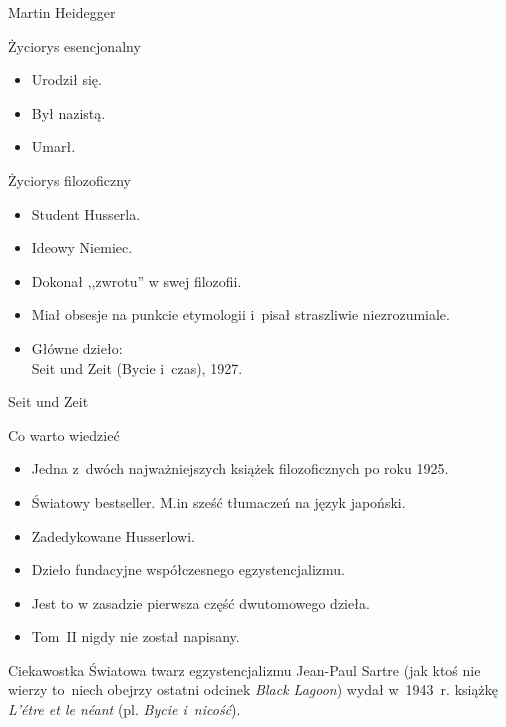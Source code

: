 \documentclass{beamer}  %
\begin{document}
\begin{frame}{Martin Heidegger}

  \begin{block}{Życiorys esencjonalny}
    \begin{itemize}
    \item Urodził się.
    \item Był nazistą.
    \item Umarł.
    \end{itemize}
  \end{block}

  \begin{block}{Życiorys filozoficzny}
    \begin{itemize}
      \pause
    \item Student Husserla.
    \item Ideowy Niemiec.
    \item Dokonał ,,zwrotu'' w swej filozofii.
    \item Miał obsesje na punkcie etymologii i~pisał straszliwie
      niezrozumiale.
    \item Główne dzieło: \\
      Seit und Zeit (Bycie i~czas), 1927.
    \end{itemize}
  \end{block}

\end{frame}



\begin{frame}{Seit und Zeit}

  \begin{block}{Co warto wiedzieć}
    \begin{itemize}
    \item Jedna z~dwóch najważniejszych książek filozoficznych po roku
      1925.
    \item Światowy bestseller. M.in sześć tłumaczeń na język japoński.
    \item Zadedykowane Husserlowi.
    \item Dzieło fundacyjne współczesnego egzystencjalizmu.
    \item Jest to w zasadzie pierwsza część dwutomowego dzieła.
    \item Tom~II nigdy nie został napisany.
    \end{itemize}
  \end{block}
  \pause

  \begin{block}{Ciekawostka}
    \pause Światowa twarz egzystencjalizmu Jean-Paul Sartre (jak ktoś
    nie wierzy to~niech obejrzy ostatni odcinek \emph{Black Lagoon})
    wydał w~1943~r. książkę \emph{L'étre et le néant} (pl. \emph{Bycie
      i~nicość}).
  \end{block}

\end{frame}
\end{document}
